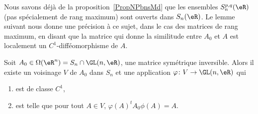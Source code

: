 Nous savons déjà de la proposition~\ref{PropNPbnsMd} que les ensembles \( S_n^{p,q}(\eR)\) (pas spécialement de rang maximum) sont ouverts dans \( S_n(\eR)\). Le lemme suivant nous donne une précision à ce sujet, dans le cas des matrices de rang maximum, en disant que la matrice qui donne la similitude entre \( A_0\) et \( A\) est localement un \( C^1\)-difféomorphisme de \( A\).
\begin{lemma}   \label{LemWLCvLXe}
	Soit \( A_0\in \Omega(\eR^n)= S_n\cap\GL(n,\eR)\), une matrice symétrique inversible. Alors il existe un voisinage \( V\) de \( A_0\) dans \( S_n\) et une application \( \varphi\colon V\to \GL(n,\eR)\) qui
	\begin{enumerate}
		\item
		      est de classe \( C^1\),
		\item
		      est telle que pour tout \( A\in V\), \( \varphi(A)^t A_0\phi(A)=A\).
	\end{enumerate}
\end{lemma}

